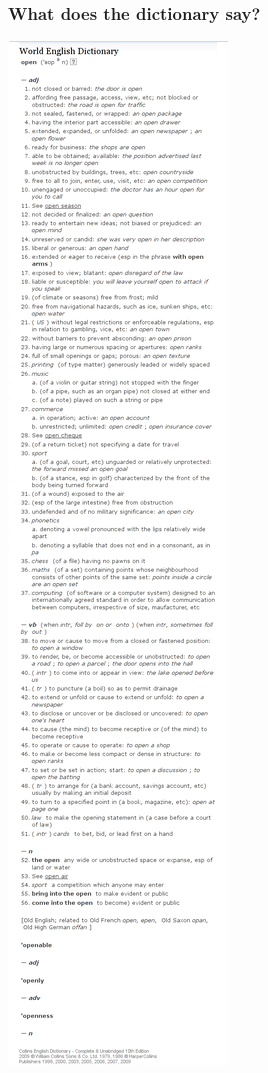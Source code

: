 \documentclass{beamer}
\begin{document}
\begin{frame}
  \frametitle{What does the dictionary say?}
  \begin{center}\includegraphics[height=0.8\textheight]{img/dictionary}\end{center}
\end{frame}
\end{document}
